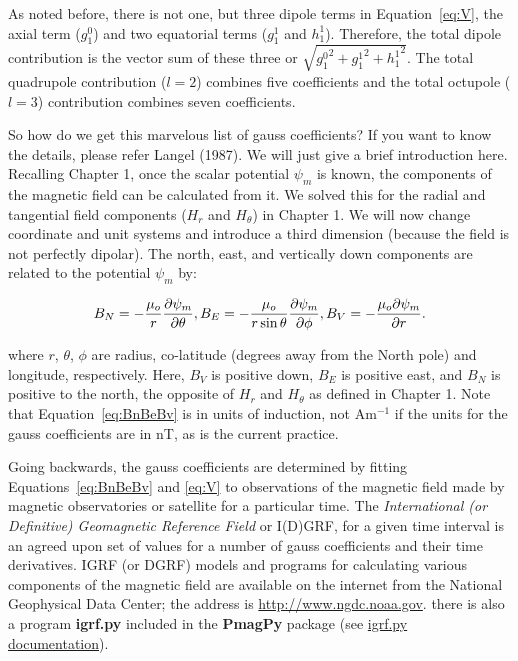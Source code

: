 As noted before, there is not one, but three dipole terms in Equation~\ref{eq:V},   the axial term ($g_1^0$) and two equatorial terms ($g_1^1$ and $h_1^1$).  
Therefore, the total dipole contribution is the vector sum of these three or $\sqrt{{g_1^0}^2+{g_1^1}^2+{h_1^1}^2}$.   The total quadrupole contribution ($l=2$) combines five coefficients and the total octupole ($l=3$)  contribution combines seven coefficients.  
 




So how do we get this marvelous list of gauss coefficients?  If you want to know the details, please refer Langel (1987). \nocite{langel87}  We will just give a brief introduction here.  
Recalling Chapter 1, once the scalar potential $\psi_m$ is known, 
the components of the magnetic field can
be calculated from it.  We solved this for the radial and tangential field components ($H_r$ and $H_{\theta}$)  in Chapter 1.   We will now change 
%
coordinate  and unit systems  and introduce a third dimension (because the field is not  perfectly dipolar).   The north, east, and vertically down components are related to the potential  $\psi_m$ by:

\begin{equation} 
B_N=-{\mu_o\over r}  {{\partial \psi_m} \over { \partial  \theta}},
 B_E=-{\mu_o\over {r \sin \theta }} {{\partial \psi_m} \over {\partial \phi}},
 B_V=-{\mu_o{\partial \psi_m} \over{ \partial r}}.
\label{eq:BnBeBv}
 \end{equation}


\noindent where $r$, $\theta$, $\phi$ are radius, co-latitude (degrees
away from the North pole) and longitude,
respectively. Here, $B_V$ is positive down, $B_E$ is positive east, and  $B_N$ is positive to the north, the opposite of
$H_r$ and $H_{\theta}$ as defined in Chapter 1. Note that
Equation~\ref{eq:BnBeBv} is in units of induction, not Am$^{-1}$ if the units for the gauss coefficients are in  nT, as is the current practice.     

Going backwards, 
the gauss coefficients  are determined by fitting 
Equations~\ref{eq:BnBeBv}
 and \ref{eq:V} to observations
of the magnetic field made by magnetic observatories or satellite for a particular time.
The {\it International (or Definitive) Geomagnetic Reference
Field}  or  I(D)GRF,  for a given time interval is an agreed upon set of values for a
number of gauss coefficients and their time derivatives.  
%
%
IGRF (or DGRF) models and programs
for calculating various components of the magnetic field
are available on the internet from the 
National Geophysical Data Center; the address is \url{http://www.ngdc.noaa.gov}.  there is also a program {\bf igrf.py} included in the {\bf PmagPy} package (see \href{http://earthref.org/PmagPy/cookbook/#igrf.py}{igrf.py documentation}).   

